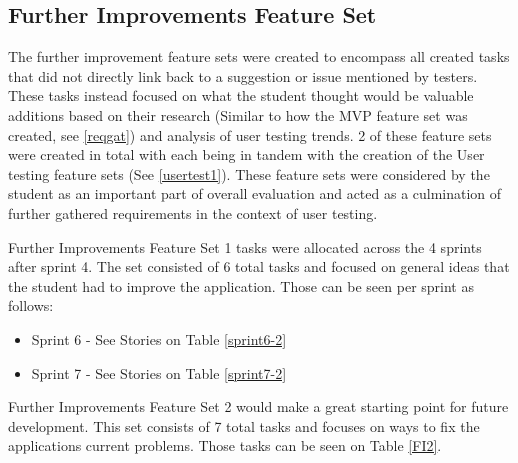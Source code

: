 \subsection{Further Improvements Feature Set}
The further improvement feature sets were created to encompass all created tasks that did not directly link back to a suggestion or issue mentioned by testers. These tasks instead focused on what the student thought would be valuable additions based on their research (Similar to how the MVP feature set was created, see \ref{reqgat}) and analysis of user testing trends. 2 of these feature sets were created in total with each being in tandem with the creation of the User testing feature sets (See \ref{usertest1}). These feature sets were considered by the student as an important part of overall evaluation and acted as a culmination of further gathered requirements in the context of user testing.

Further Improvements Feature Set 1 tasks were allocated across the 4 sprints after sprint 4. The set consisted of 6 total tasks and focused on general ideas that the student had to improve the application. Those can be seen per sprint as follows:

\begin{itemize}
    \item Sprint 6 - See Stories on Table \ref{sprint6-2}
    \item Sprint 7 - See Stories on Table \ref{sprint7-2}
\end{itemize}

Further Improvements Feature Set 2 would make a great starting point for future development. This set consists of 7 total tasks and focuses on ways to fix the applications current problems. Those tasks can be seen on Table \ref{FI2}.